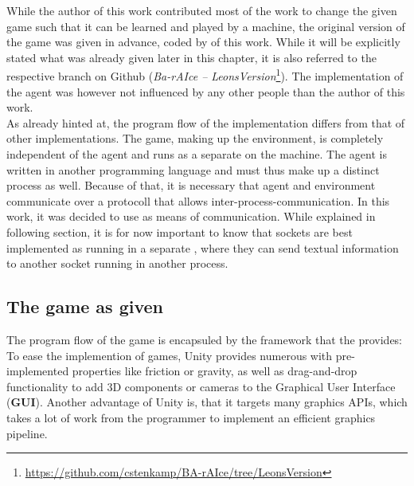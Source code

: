 While the author of this work contributed most of the work to change the given game such that it can be learned and played by a machine, the original version of the game was given in advance, coded by \leon of this work. While it will be explicitly stated what was already given later in this chapter, it is also referred to the respective branch on Github (\textit{Ba-rAIce -- LeonsVersion}\footnote{\url{https://github.com/cstenkamp/BA-rAIce/tree/LeonsVersion}}). The implementation of the agent was however not influenced by any other people than the author of this work.\\

\noindent As already hinted at, the program flow of the implementation differs from that of other implementations. The game, making up the environment, is completely independent of the agent and runs as a separate  on the machine. The agent is written in another programming language and must thus make up a distinct process as well. Because of that, it is necessary that agent and environment communicate over a protocoll that allows inter-process-communication. In this work, it was decided to use  as means of communication. While explained in following section, it is for now important to know that sockets are best implemented as running in a separate , where they can send textual information to another socket running in another process.

\subsection{The game as given}
\label{ch:gamedescription}

The program flow of the game is encapsuled by the framework that the  provides: To ease the implemention of games, Unity provides numerous  with pre-implemented properties like friction or gravity, as well as drag-and-drop functionality to add 3D components or cameras to the Graphical User Interface (\textbf{GUI}). Another advantage of Unity is, that it targets many graphics APIs, which takes a lot of work from the programmer to implement an efficient graphics pipeline.

